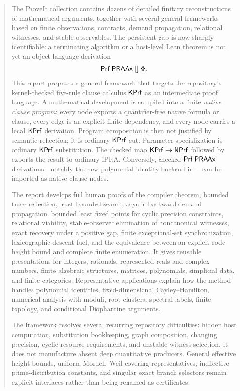 \begin{abstract}
The ProveIt collection contains dozens of detailed finitary reconstructions of
mathematical arguments, together with several general frameworks based on finite
observations, contracts, demand propagation, relational witnesses, and stable
observables.  The persistent gap is now sharply identifiable: a terminating
algorithm or a host-level Lean theorem is not yet an object-language derivation
\[
             \Prf\;\PRAAx\;[]\;\Phi.
\]
This report proposes a general framework that targets the repository's
kernel-checked five-rule clause calculus \(\KPrf\) as an intermediate proof
language.  A mathematical development is compiled into a finite \emph{native
clause program}: every node exports a quantifier-free native formula or clause,
every edge is an explicit finite dependency, and every node carries a local
\(\KPrf\) derivation.  Program composition is then not justified by semantic
reflection; it is ordinary \(\KPrf\) cut.  Parameter specialization is ordinary
\(\KPrf\) substitution.  The checked map \(\KPrf\to\NPrf\) followed by
 exports the result to ordinary iPRA.  Conversely, checked
\(\Prf\;\PRAAx\) derivations---notably the new polynomial identity backend in
---can be imported as native clause nodes.

The report develops full human proofs of the compiler theorem, bounded trace
reflection, least bounded search, acyclic backward demand propagation, bounded
least fixed points for cyclic precision constraints, relational viability,
stable-observer elimination of noncanonical witnesses, exact recovery under a
positive gap, finite exceptional-set synchronization, lexicographic descent
fuel, and the equivalence between an explicit code-height bound and complete
finite enumeration.  It gives reusable presentations for integers, rationals,
represented reals and complex numbers, finite algebraic structures, matrices,
polynomials, simplicial data, and finite categories.  Representative
applications explain how the method handles polynomial identities,
fixed-dimensional Cayley--Hamilton, numerical analysis with moduli, root
clusters, spectral labels, finite topology, and conditional Diophantine
arguments.

The framework resolves several recurring repository difficulties: hidden host
computation, substitution bookkeeping, graph composition, changing precision,
cyclic resource requirements, and unstable witness selection.  It does not
manufacture absent deep quantitative producers.  General effective height
bounds, uniform Mordell--Weil covering representatives, ineffective
prime-distribution constants, and singular exact branch selectors remain
explicit interfaces rather than being renamed as certificates.
\end{abstract}

